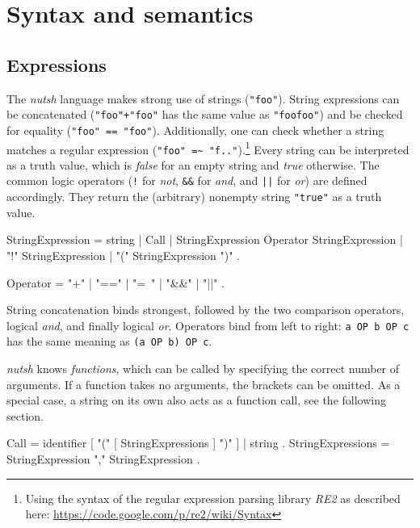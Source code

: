 \documentclass[paper=a4,twoside,abstract=on,cleardoublepage=empty,numbers=noenddot,toc=bib,12pt,appendixprefix=true]{scrreprt}
\begin{document}
\section{Syntax and semantics}

\subsection{Expressions}


The \emph{nutsh} language makes strong use of strings (\texttt{"foo"}). String expressions can be concatenated (\texttt{"foo"+"foo"} has the same value as \texttt{"foofoo"}) and be checked for equality (\texttt{"foo" == "foo"}). Additionally, one can check whether a string matches a regular expression (\texttt{"foo" =\textasciitilde\ "f.."}).\footnote{Using the syntax of the regular expression parsing library \emph{RE2} as described here: \url{https://code.google.com/p/re2/wiki/Syntax}} Every string can be interpreted as a truth value, which is \emph{false} for an empty string and \emph{true} otherwise. The common logic operators (\texttt{!} for \emph{not}, \texttt{\&\&} for \emph{and}, and \texttt{||} for \emph{or}) are defined accordingly. They return the (arbitrary) nonempty string \texttt{"true"} as a truth value.

\begin{ebnf}
StringExpression =
    string | Call | StringExpression Operator StringExpression |
    "!" StringExpression | "(" StringExpression ")" .

Operator = "+" | "==" | "=~" | "&&" | "||" .
\end{ebnf}


String concatenation binds strongest, followed by the two comparison operators, logical \emph{and}, and finally logical \emph{or}. Operators bind from left to right: \texttt{a OP b OP c} has the same meaning as \texttt{(a OP b) OP c}.


\emph{nutsh} knows \emph{functions}, which can be called by specifying the correct number of arguments. If a function takes no arguments, the brackets can be omitted. As a special case, a string on its own also acts as a function call, see the following section.

\begin{ebnf}
Call = identifier [ "(" [ StringExpressions ] ")" ] | string .
StringExpressions = StringExpression { "," StringExpression } .
\end{ebnf}
\end{document}
